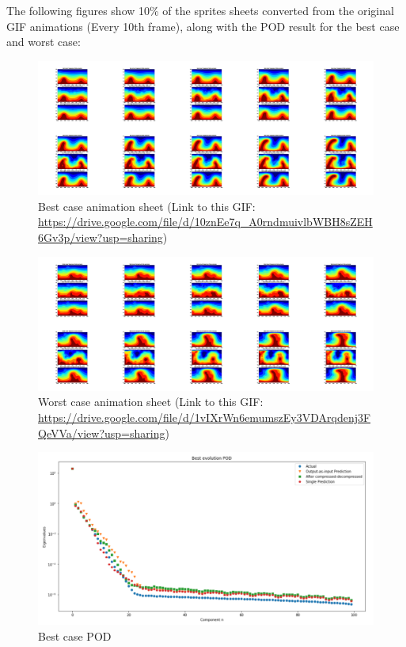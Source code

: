 The following figures show 10\% of the sprites sheets converted from the original GIF animations (Every 10th frame), along with the POD result for the best case and worst case:

\begin{figure}[H]
    \centering
    \caption{Best case animation sheet (Link to this GIF: \url{https://drive.google.com/file/d/10znEe7q_A0rndmuivlbWBH8sZEH6Gv3p/view?usp=sharing})}
    \includegraphics[scale=0.10]{Report LaTeX/figures/mantle_convection_images/larger_dataset_interpolated/FNN_Best_GIF_sheet.png}
\end{figure}

\begin{figure}[H]
    \centering
    \caption{Worst case animation sheet (Link to this GIF: 
    \url{https://drive.google.com/file/d/1vIXrWn6emumszEy3VDArqdenj3FQeVVa/view?usp=sharing})}
    \includegraphics[scale=0.10]{Report LaTeX/figures/mantle_convection_images/larger_dataset_interpolated/FNN_Worst_GIF_sheet.png}
\end{figure}


\begin{figure}[H]
    \caption{Best case POD}
    \includegraphics[scale=0.5]{Report LaTeX/figures/mantle_convection_images/larger_dataset_interpolated/FNN_Best_POD.png}
\end{figure}

